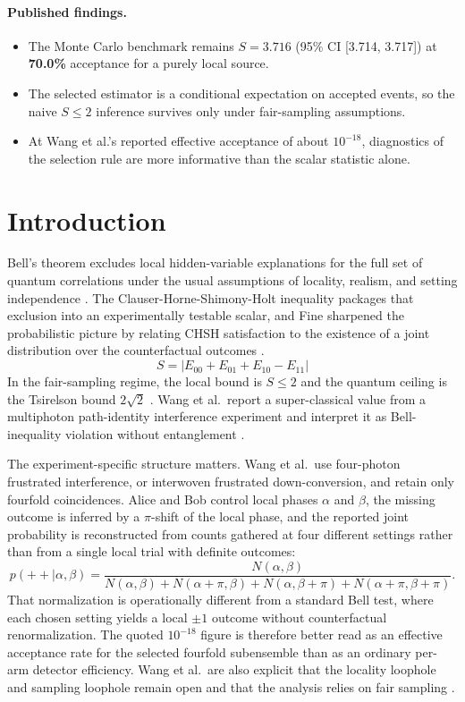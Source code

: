 \documentclass[11pt]{article}
\begin{document}
\paragraph{Published findings.}
\begin{itemize}
  \item The Monte Carlo benchmark remains \textbf{$S = 3.716$} (95\% CI [3.714, 3.717]) at \textbf{70.0\%} acceptance for a purely local source.
  \item The selected estimator is a conditional expectation on accepted events, so the naive $S \le 2$ inference survives only under fair-sampling assumptions.
  \item At Wang et al.'s reported effective acceptance of about $10^{-18}$, diagnostics of the selection rule are more informative than the scalar statistic alone.
\end{itemize}

\section{Introduction}

Bell's theorem excludes local hidden-variable explanations for the full set of quantum correlations under the usual assumptions of locality, realism, and setting independence \cite{bell1964}. The Clauser-Horne-Shimony-Holt inequality packages that exclusion into an experimentally testable scalar, and Fine sharpened the probabilistic picture by relating CHSH satisfaction to the existence of a joint distribution over the counterfactual outcomes \cite{chsh1969,fine1982}.
\[
S = \left|E_{00} + E_{01} + E_{10} - E_{11}\right|
\]
In the fair-sampling regime, the local bound is $S \le 2$ and the quantum ceiling is the Tsirelson bound $2\sqrt{2}$ \cite{tsirelson1980}. Wang et al.~report a super-classical value from a multiphoton path-identity interference experiment and interpret it as Bell-inequality violation without entanglement \cite{wang2025}.

The experiment-specific structure matters. Wang et al.~use four-photon frustrated interference, or interwoven frustrated down-conversion, and retain only fourfold coincidences. Alice and Bob control local phases $\alpha$ and $\beta$, the missing outcome is inferred by a $\pi$-shift of the local phase, and the reported joint probability is reconstructed from counts gathered at four different settings rather than from a single local trial with definite outcomes:
\[
p(++|\alpha,\beta)=\frac{N(\alpha,\beta)}{N(\alpha,\beta)+N(\alpha+\pi,\beta)+N(\alpha,\beta+\pi)+N(\alpha+\pi,\beta+\pi)}.
\]
That normalization is operationally different from a standard Bell test, where each chosen setting yields a local $\pm 1$ outcome without counterfactual renormalization. The quoted $10^{-18}$ figure is therefore better read as an effective acceptance rate for the selected fourfold subensemble than as an ordinary per-arm detector efficiency. Wang et al.~are also explicit that the locality loophole and sampling loophole remain open and that the analysis relies on fair sampling \cite{wang2025}.
\end{document}
